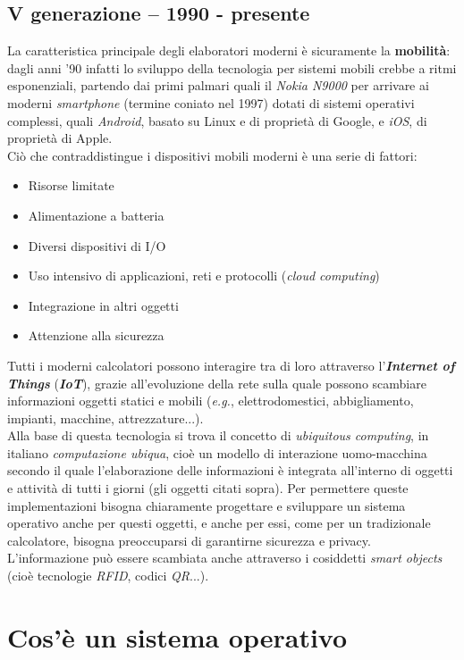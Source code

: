 \documentclass[12pt, letterpaper]{article}
\begin{document}
\subsection{V generazione -- 1990 - presente}
La caratteristica principale degli elaboratori moderni è sicuramente la \textbf{mobilità}: dagli anni '90 infatti lo sviluppo della tecnologia per sistemi mobili crebbe a ritmi esponenziali, partendo dai primi palmari quali il \textit{Nokia N9000} per arrivare ai moderni \textit{smartphone} (termine coniato nel 1997) dotati di sistemi operativi complessi, quali \textit{Android}, basato su Linux e di proprietà di Google, e \textit{iOS}, di proprietà di Apple. \\
Ciò che contraddistingue i dispositivi mobili moderni è una serie di fattori:
\begin{itemize}
    \item Risorse limitate
    \item Alimentazione a batteria
    \item Diversi dispositivi di I/O
    \item Uso intensivo di applicazioni, reti e protocolli (\textit{cloud computing})
    \item Integrazione in altri oggetti
    \item Attenzione alla sicurezza
\end{itemize}
Tutti i moderni calcolatori possono interagire tra di loro attraverso l'\textit{\textbf{Internet of Things}} (\textit{\textbf{IoT}}), grazie all'evoluzione della rete sulla quale possono scambiare informazioni oggetti statici e mobili (\textit{e.g.}, elettrodomestici, abbigliamento, impianti, macchine, attrezzature...). \\
Alla base di questa tecnologia si trova il concetto di \textit{ubiquitous computing}, in italiano \textit{computazione ubiqua}, cioè un modello di interazione uomo-macchina secondo il quale l'elaborazione delle informazioni è integrata all'interno di oggetti e attività di tutti i giorni (gli oggetti citati sopra). Per permettere queste implementazioni bisogna chiaramente progettare e sviluppare un sistema operativo anche per questi oggetti, e anche per essi, come per un tradizionale calcolatore, bisogna preoccuparsi di garantirne sicurezza e privacy.\\
L'informazione può essere scambiata anche attraverso i cosiddetti \textit{smart objects} (cioè tecnologie \textit{RFID}, codici \textit{QR}...).
\newpage

\section{Cos'è un sistema operativo}
\end{document}
